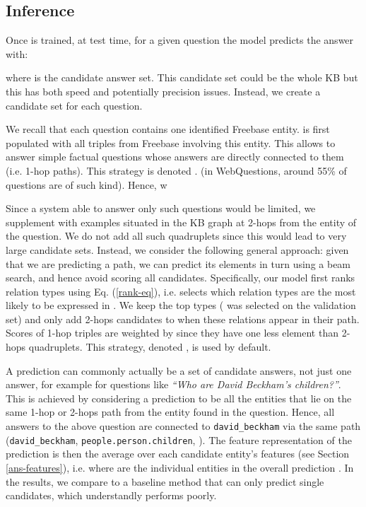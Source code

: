 \documentclass[runningheads,a4paper]{llncs}
\newcommand{\fb}{{\sc Freebase}\xspace}
\newcommand{\wq}{{\sc WebQuestions}\xspace}
\newcommand{\ent}[1]{{\small {\tt #1}}}
\begin{document}
\subsection{Inference} \label{inference} \label{multiple-ans}
Once  is trained, at test time, for a given
question  the model predicts the answer with:

where  is the candidate answer set.
This candidate set could be the whole KB but this has both speed and
potentially precision issues. Instead, we create a candidate set 
 for each question. 

We recall that each question contains
one identified \fb entity.
 is first populated with all triples from \fb
involving this entity. This allows to answer simple factual questions
whose answers are directly connected to them (i.e. 1-hop paths). This
strategy is denoted .
 (in \wq, around 55\% of questions are of such kind). Hence, w \fi


Since a system able to answer only such questions would be limited, we
supplement  with examples situated in the KB graph at
2-hops from the entity of the question. We do not add all such
quadruplets since this would lead to very large candidate sets. Instead,
we consider the following general approach: given that we are
predicting a path, we can predict its elements in turn using a beam
search, and hence avoid scoring all candidates.
Specifically, our model first ranks relation types using
Eq. (\ref{rank-eq}), i.e.  selects which relation types are the most
likely to be expressed in . We keep the top  types ( was
selected on the validation set) and only add 2-hops candidates to
 when these relations appear in their path. Scores of
1-hop triples are weighted by  since they have one less
element than 2-hops quadruplets.  This strategy, denoted , is used by
default.


A prediction  can commonly actually be a set of candidate answers,
not just one answer, for example for questions like {\em ``Who are David
Beckham's children?''}. This is achieved by considering a prediction to
be all the entities that lie on the same 1-hop or 2-hops path from the
entity found in the question. 
Hence, all answers to the above question are connected to
\ent{david\_beckham} via the same path (\ent{david\_beckham},
\ent{people.person.children}, \ent{*}).
The feature representation of the prediction is then the average over
each candidate entity's features (see Section \ref{ans-features}),
i.e. 
where  are the individual entities in the overall prediction
. In the results, we compare to a baseline method that can only
predict single candidates, which understandly performs poorly.
\end{document}
